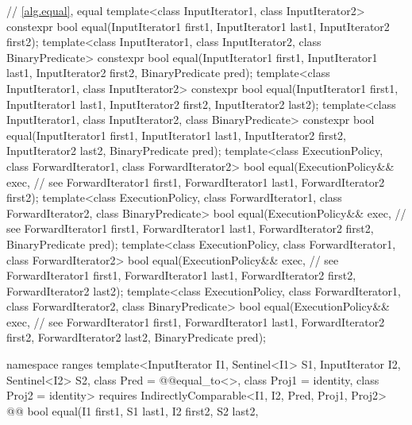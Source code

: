 \begin{codeblock}
  // \ref{alg.equal}, equal
  template<class InputIterator1, class InputIterator2>
    constexpr bool equal(InputIterator1 first1, InputIterator1 last1,
                         InputIterator2 first2);
  template<class InputIterator1, class InputIterator2, class BinaryPredicate>
    constexpr bool equal(InputIterator1 first1, InputIterator1 last1,
                         InputIterator2 first2, BinaryPredicate pred);
  template<class InputIterator1, class InputIterator2>
    constexpr bool equal(InputIterator1 first1, InputIterator1 last1,
                         InputIterator2 first2, InputIterator2 last2);
  template<class InputIterator1, class InputIterator2, class BinaryPredicate>
    constexpr bool equal(InputIterator1 first1, InputIterator1 last1,
                         InputIterator2 first2, InputIterator2 last2,
                         BinaryPredicate pred);
  template<class ExecutionPolicy, class ForwardIterator1, class ForwardIterator2>
    bool equal(ExecutionPolicy&& exec, // see 
               ForwardIterator1 first1, ForwardIterator1 last1,
               ForwardIterator2 first2);
  template<class ExecutionPolicy, class ForwardIterator1, class ForwardIterator2,
           class BinaryPredicate>
    bool equal(ExecutionPolicy&& exec, // see 
               ForwardIterator1 first1, ForwardIterator1 last1,
               ForwardIterator2 first2, BinaryPredicate pred);
  template<class ExecutionPolicy, class ForwardIterator1, class ForwardIterator2>
    bool equal(ExecutionPolicy&& exec, // see 
               ForwardIterator1 first1, ForwardIterator1 last1,
               ForwardIterator2 first2, ForwardIterator2 last2);
  template<class ExecutionPolicy, class ForwardIterator1, class ForwardIterator2,
           class BinaryPredicate>
    bool equal(ExecutionPolicy&& exec, // see 
               ForwardIterator1 first1, ForwardIterator1 last1,
               ForwardIterator2 first2, ForwardIterator2 last2,
               BinaryPredicate pred);
\end{codeblock}\begin{addedblock}\begin{codeblock}
  namespace ranges {
    template<InputIterator I1, Sentinel<I1> S1, InputIterator I2, Sentinel<I2> S2,
        class Pred = @@equal_to<>, class Proj1 = identity, class Proj2 = identity>
      requires IndirectlyComparable<I1, I2, Pred, Proj1, Proj2>
      @@ bool equal(I1 first1, S1 last1, I2 first2, S2 last2,
}
\end{codeblock}
\end{addedblock}
